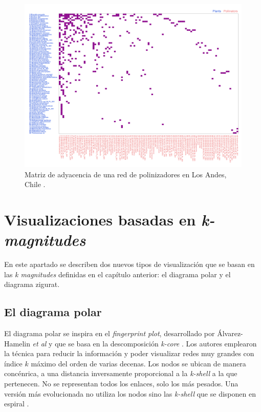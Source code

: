 \begin{figure}[h!]
\centering
\includegraphics[scale=0.4]{Figures/VIS_matrix_PL_001.png}
\caption{Matriz de adyacencia de una red de polinizadores en Los Andes, Chile \cite{arroyo1982community}.}
\label{fig:VIS_matrix_PL_001}
\end{figure}


\section{Visualizaciones basadas en \textit{k-magnitudes}}

En este apartado se describen dos nuevos tipos de visualización que se basan en las \textit{k magnitudes} definidas en el capítulo anterior: el diagrama polar y el diagrama zigurat.

\subsection{El diagrama polar}

El diagrama polar se inspira en el \textit{fingerprint plot}, desarrollado por Álvarez-Hamelin \textit{et al} y que se basa en la descomposición \textit{k-core} \cite{alvarez2005k}. Los autores emplearon la técnica para reducir la información y poder visualizar redes muy grandes con índice $k$ máximo del orden de varias decenas. Los nodos se ubican de manera concénrica, a una distancia inversamente proporcional a la \textit{k-shell} a la que pertenecen. No se representan todos los enlaces, solo los más pesados. Una versión más evolucionada no utiliza los nodos sino las \textit{k-shell} que se disponen en espiral \cite{barbera2015critical}.

